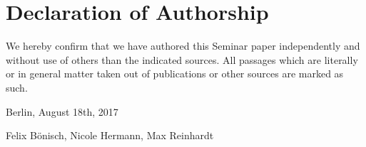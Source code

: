 \documentclass[a4paper,11pt]{article}
\begin{document}
\newpage
{}
\listoftables


\newpage
\pagestyle{plain}
\setcounter{page}{1}    %











\appendix

\newpage
\renewcommand{\thepage}{\roman{page}} \setcounter{page}{4}


\newpage

\newpage

\newpage




\newpage
\thispagestyle{empty}

\section*{Declaration of Authorship}

We hereby confirm that we have authored this Seminar paper independently and without use of others than the indicated sources. All passages which are literally or in general matter taken out of publications or other sources are marked as such.
\vspace{1cm}

Berlin, August 18th, 2017 \vspace{0.9cm}

Felix B\"onisch, Nicole Hermann, Max Reinhardt
\end{document}
